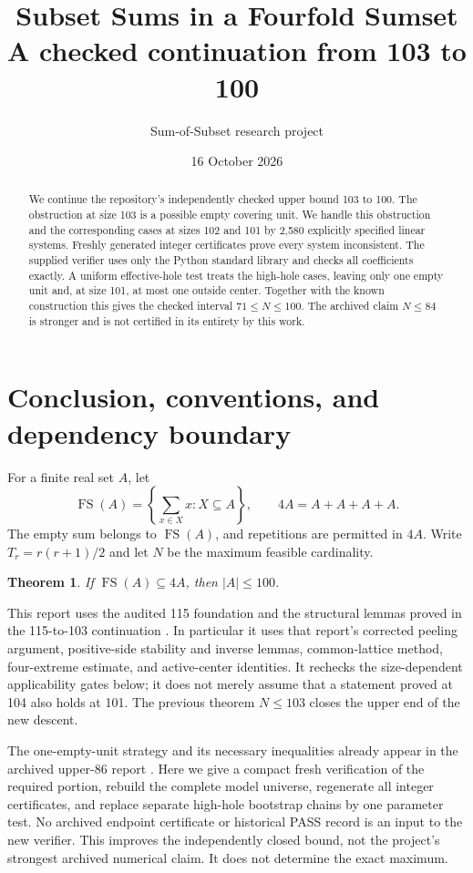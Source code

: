 \documentclass[11pt,a4paper]{article}
\title{Subset Sums in a Fourfold Sumset\\\large A checked continuation from 103 to 100}
\author{Sum-of-Subset research project}
\date{16 October 2026}
\newcommand{\FS}{\operatorname{FS}}
\newtheorem{theorem}{Theorem}[section]
\begin{document}
\maketitle
\begin{abstract}
We continue the repository's independently checked upper bound 103 to 100.
The obstruction at size 103 is a possible empty covering unit. We handle
this obstruction and the corresponding cases at sizes 102 and 101 by
2,580 explicitly specified linear systems. Freshly generated integer
certificates prove every system inconsistent. The supplied verifier uses
only the Python standard library and checks all coefficients exactly.
A uniform effective-hole test treats the high-hole cases, leaving only
one empty unit and, at size 101, at most one outside center.
Together with the known construction this gives the checked interval
$71\le N\le100$. The archived claim $N\le84$ is stronger and is not
certified in its entirety by this work.
\end{abstract}
\tableofcontents

\section{Conclusion, conventions, and dependency boundary}
For a finite real set $A$, let
\[
 \FS(A)=\left\{\sum_{x\in X}x:X\subseteq A\right\},\qquad
 4A=A+A+A+A.
\]
The empty sum belongs to $\FS(A)$, and repetitions are permitted in $4A$.
Write $T_r=r(r+1)/2$ and let $N$ be the maximum feasible cardinality.
\begin{theorem}\label{thm:main}
If $\FS(A)\subseteq4A$, then $|A|\le100$.
\end{theorem}
This report uses the audited 115 foundation and the structural lemmas
proved in the 115-to-103 continuation \cite{previous}. In particular it
uses that report's corrected peeling argument, positive-side stability
and inverse lemmas, common-lattice method, four-extreme estimate, and
active-center identities. It rechecks the size-dependent applicability
gates below; it does not merely assume that a statement proved at 104
also holds at 101. The previous theorem $N\le103$ closes the upper end
of the new descent.

The one-empty-unit strategy and its necessary inequalities already appear
in the archived upper-86 report \cite{archive}. Here we give a compact
fresh verification of the required portion, rebuild the complete model
universe, regenerate all integer certificates, and replace separate
high-hole bootstrap chains by one parameter test. No archived endpoint
certificate or historical PASS record is an input to the new verifier.
This improves the independently closed bound, not the project's strongest
archived numerical claim. It does not determine the exact maximum.
\end{document}
